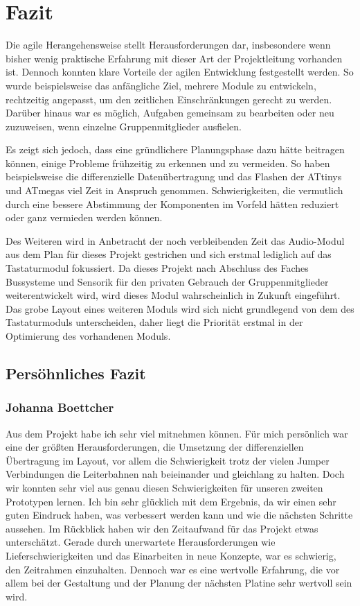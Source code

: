 \section{Fazit}
Die agile Herangehensweise stellt  Herausforderungen dar, insbesondere wenn bisher wenig praktische Erfahrung mit dieser Art der Projektleitung vorhanden ist. Dennoch konnten klare Vorteile der agilen Entwicklung festgestellt werden. So wurde beispielsweise das anfängliche Ziel, mehrere Module zu entwickeln, rechtzeitig angepasst, um den zeitlichen Einschränkungen gerecht zu werden. Darüber hinaus war es möglich, Aufgaben gemeinsam zu bearbeiten oder neu zuzuweisen, wenn einzelne Gruppenmitglieder ausfielen.

Es zeigt sich jedoch, dass eine gründlichere Planungsphase dazu hätte beitragen können, einige Probleme frühzeitig zu erkennen und zu vermeiden. So haben beispielsweise die differenzielle Datenübertragung und das Flashen der ATtinys und ATmegas viel Zeit in Anspruch genommen. Schwierigkeiten, die vermutlich durch eine bessere Abstimmung der Komponenten im Vorfeld hätten reduziert oder ganz vermieden werden können.

Des Weiteren wird in Anbetracht der noch verbleibenden Zeit das Audio-Modul aus dem Plan für dieses Projekt gestrichen und sich erstmal lediglich auf das Tastaturmodul fokussiert. Da dieses Projekt nach Abschluss des Faches \glqq Bussysteme und Sensorik\grqq{} für den privaten Gebrauch der Gruppenmitglieder weiterentwickelt wird, wird dieses Modul wahrscheinlich in Zukunft eingeführt. Das grobe Layout eines weiteren Moduls wird sich nicht grundlegend von dem des Tastaturmoduls unterscheiden, daher liegt die Priorität erstmal in der Optimierung des vorhandenen Moduls.


\subsection{Persöhnliches Fazit}
\subsubsection{Johanna Boettcher}

Aus dem Projekt habe ich sehr viel mitnehmen können. Für mich persönlich war eine der größten Herausforderungen, die Umsetzung der differenziellen Übertragung im Layout, vor allem die Schwierigkeit trotz der vielen Jumper Verbindungen die Leiterbahnen nah beieinander und gleichlang zu halten. Doch wir konnten sehr viel aus genau diesen Schwierigkeiten für unseren zweiten Prototypen lernen. Ich bin sehr glücklich mit dem Ergebnis, da wir einen sehr guten Eindruck haben, was verbessert werden kann und wie die nächsten Schritte aussehen. 
\newline
Im Rückblick haben wir den Zeitaufwand für das Projekt etwas unterschätzt. Gerade durch unerwartete Herausforderungen wie Lieferschwierigkeiten und das Einarbeiten in neue Konzepte, war es schwierig, den Zeitrahmen einzuhalten. Dennoch war es eine wertvolle Erfahrung, die vor allem bei der Gestaltung und der Planung der nächsten Platine sehr wertvoll sein wird.



